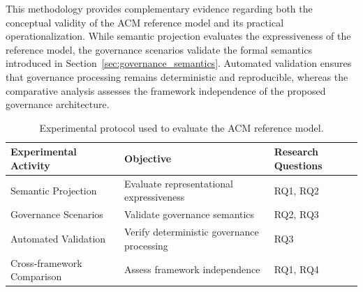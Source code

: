 \documentclass[10pt]{article}
\begin{document}
This methodology provides complementary evidence regarding both the conceptual validity of the ACM reference model and its practical operationalization. While semantic projection evaluates the expressiveness of the reference model, the governance scenarios validate the formal semantics introduced in Section~\ref{sec:governance_semantics}. Automated validation ensures that governance processing remains deterministic and reproducible, whereas the comparative analysis assesses the framework independence of the proposed governance architecture.

\begin{table}[ht]
\centering
\caption{Experimental protocol used to evaluate the ACM reference model.}
\label{tab:experimental_protocol}

\begin{tabular}{p{3.8cm}p{3.8cm}p{4.4cm}}
\toprule
\textbf{Experimental Activity} &
\textbf{Objective} &
\textbf{Research Questions} \\
\midrule

Semantic Projection &
Evaluate representational expressiveness &
RQ1, RQ2 \\

Governance Scenarios &
Validate governance semantics &
RQ2, RQ3 \\

Automated Validation &
Verify deterministic governance processing &
RQ3 \\

Cross-framework Comparison &
Assess framework independence &
RQ1, RQ4 \\

\bottomrule
\end{tabular}

\end{table}
\end{document}
